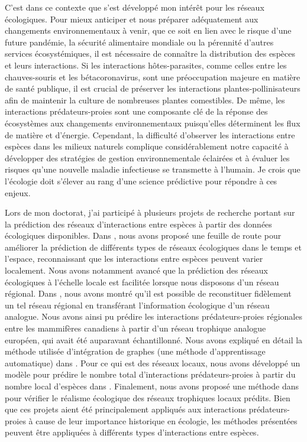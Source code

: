 \documentclass[12pt,twoside,phd]{dms}
\numberwithin{equation}{section}
\numberwithin{table}{chapter}
\numberwithin{figure}{chapter}
\begin{document}
C'est dans ce contexte que s'est développé mon intérêt pour les réseaux
écologiques. Pour mieux anticiper et nous préparer adéquatement aux changements
environnementaux à venir, que ce soit en lien avec le risque d'une future
pandémie, la sécurité alimentaire mondiale ou la pérennité d'autres services
écosystémiques, il est nécessaire de connaître la distribution des espèces et
leurs interactions. Si les interactions hôtes-parasites, comme celles entre les
chauves-souris et les bétacoronavirus, sont une préoccupation majeure en matière
de santé publique, il est crucial de préserver les interactions
plantes-pollinisateurs afin de maintenir la culture de nombreuses plantes
comestibles. De même, les interactions prédateurs-proies sont une composante clé
de la réponse des écosystèmes aux changements environnementaux puisqu'elles
déterminent les flux de matière et d'énergie. Cependant, la difficulté
d'observer les interactions entre espèces dans les milieux naturels complique
considérablement notre capacité à développer des stratégies de gestion
environnementale éclairées et à évaluer les risques qu'une nouvelle maladie
infectieuse se transmette à l'humain. Je crois que l'écologie doit s'élever au
rang d'une science prédictive pour répondre à ces enjeux.

Lors de mon doctorat, j'ai participé à plusieurs projets de recherche portant
sur la prédiction des réseaux d'interactions entre espèces à partir des données
écologiques disponibles. Dans \textcite{Strydom2021Roadmapa}, nous avons proposé une
feuille de route pour améliorer la prédiction de différents types de réseaux
écologiques dans le temps et l'espace, reconnaissant que les interactions entre
espèces peuvent varier localement. Nous avons notamment avancé que la prédiction
des réseaux écologiques à l'échelle locale est facilitée lorsque nous disposons
d'un réseau régional. Dans \textcite{Strydom2022Food}, nous avons montré qu'il est
possible de reconstituer fidèlement un tel réseau régional en transférant
l'information écologique d'un réseau analogue. Nous avons ainsi pu prédire les
interactions prédateurs-proies régionales entre les mammifères canadiens à
partir d'un réseau trophique analogue européen, qui avait été auparavant
échantillonné. Nous avons expliqué en détail la méthode utilisée d'intégration
de graphes (une méthode d'apprentissage automatique) dans
\textcite{Strydom2023Grapha}. Pour ce qui est des réseaux locaux, nous avons
développé un modèle pour prédire le nombre total d'interactions
prédateurs-proies à partir du nombre local d'espèces dans
\textcite{MacDonald2020Revisiting}. Finalement, nous avons proposé une méthode dans
\textcite{Higino2023Mismatch} pour vérifier le réalisme écologique des réseaux
trophiques locaux prédits. Bien que ces projets aient été principalement
appliqués aux interactions prédateurs-proies à cause de leur importance
historique en écologie, les méthodes présentées peuvent être appliquées à
différents types d'interactions entre espèces. 
\end{document}
